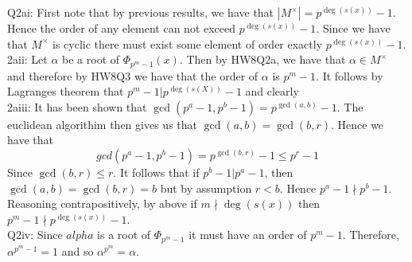 \documentclass[letterpaper]{article}
\begin{document}
\noindent Q2ai: First note that by previous results, we have that $|M^\times|= p^{\deg(s(x))}-1$. Hence the order of any element can not exceed $p^{\deg(s(x))}-1$. Since we have that $M^\times$ is cyclic there must exist some element of order exactly $p^{\deg(s(x))}-1$. 
\newline \\ 2aii: Let $\alpha$ be a root of $\Phi_{p^m-1}(x)$. Then by HW8Q2a, we have that $\alpha\in M^\times$ and therefore by HW8Q3 we have that the order of $\alpha$ is $p^m-1$. It follows by Lagranges theorem that $p^m-1 |p^{\deg(s(X))}-1$ and clearly 
\newline \\ 2aiii: It has been shown that $\gcd(p^a-1,p^b-1)=p^{\gcd(a,b)}-1$. The euclidean algorithim then gives us that $\gcd(a,b) = \gcd(b,r)$. Hence we have that $$gcd(p^a-1,p^b-1) = p^{\gcd(b,r)}-1 \leq p^{r}-1$$
Since $\gcd(b,r)\leq r$. It follows that if $p^b-1 | p^a-1$, then $\gcd(a,b)= \gcd(b,r)=b$ but by assumption $r<b$. Hence $p^a-1\nmid p^b-1$. Reasoning contrapositively, by above if $m\nmid \deg(s(x))$ then $p^m-1 \nmid p^{\deg(s(x))}-1$. 
\newline \\ Q2iv: Since $alpha$ is a root of $\Phi_{p^m-1}$ it must have an order of $p^m-1$. Therefore, $\alpha^{p^m-1}=1$ and so $\alpha^{p^m}=\alpha$.  
\end{document}
